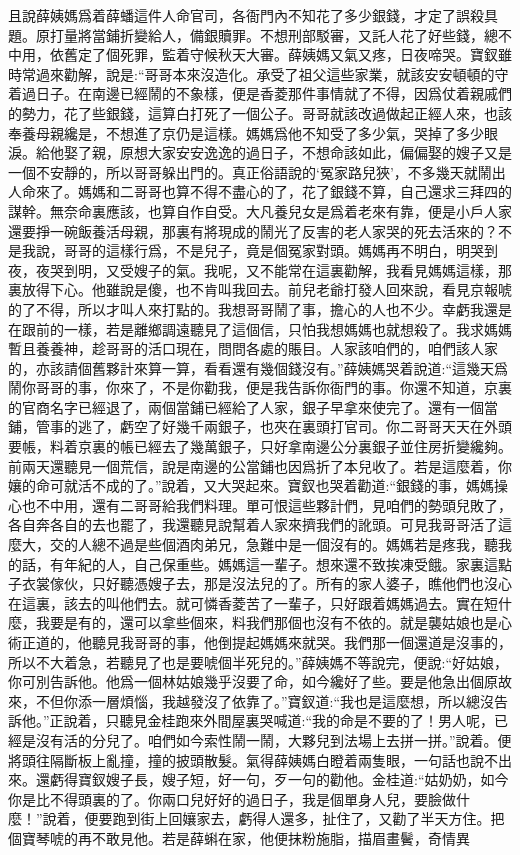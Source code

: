 \begin{parag}
    且說薛姨媽爲着薛蟠這件人命官司，各衙門內不知花了多少銀錢，才定了誤殺具題。原打量將當鋪折變給人，備銀贖罪。不想刑部駁審，又託人花了好些錢，總不中用，依舊定了個死罪，監着守候秋天大審。薛姨媽又氣又疼，日夜啼哭。寶釵雖時常過來勸解，說是:“哥哥本來沒造化。承受了祖父這些家業，就該安安頓頓的守着過日子。在南邊已經鬧的不象樣，便是香菱那件事情就了不得，因爲仗着親戚們的勢力，花了些銀錢，這算白打死了一個公子。哥哥就該改過做起正經人來，也該奉養母親纔是，不想進了京仍是這樣。媽媽爲他不知受了多少氣，哭掉了多少眼淚。給他娶了親，原想大家安安逸逸的過日子，不想命該如此，偏偏娶的嫂子又是一個不安靜的，所以哥哥躲出門的。真正俗語說的‘冤家路兒狹’，不多幾天就鬧出人命來了。媽媽和二哥哥也算不得不盡心的了，花了銀錢不算，自己還求三拜四的謀幹。無奈命裏應該，也算自作自受。大凡養兒女是爲着老來有靠，便是小戶人家還要掙一碗飯養活母親，那裏有將現成的鬧光了反害的老人家哭的死去活來的？不是我說，哥哥的這樣行爲，不是兒子，竟是個冤家對頭。媽媽再不明白，明哭到夜，夜哭到明，又受嫂子的氣。我呢，又不能常在這裏勸解，我看見媽媽這樣，那裏放得下心。他雖說是傻，也不肯叫我回去。前兒老爺打發人回來說，看見京報唬的了不得，所以才叫人來打點的。我想哥哥鬧了事，擔心的人也不少。幸虧我還是在跟前的一樣，若是離鄉調遠聽見了這個信，只怕我想媽媽也就想殺了。我求媽媽暫且養養神，趁哥哥的活口現在，問問各處的賬目。人家該咱們的，咱們該人家的，亦該請個舊夥計來算一算，看看還有幾個錢沒有。”薛姨媽哭着說道:“這幾天爲鬧你哥哥的事，你來了，不是你勸我，便是我告訴你衙門的事。你還不知道，京裏的官商名字已經退了，兩個當鋪已經給了人家，銀子早拿來使完了。還有一個當鋪，管事的逃了，虧空了好幾千兩銀子，也夾在裏頭打官司。你二哥哥天天在外頭要帳，料着京裏的帳已經去了幾萬銀子，只好拿南邊公分裏銀子並住房折變纔夠。前兩天還聽見一個荒信，說是南邊的公當鋪也因爲折了本兒收了。若是這麼着，你孃的命可就活不成的了。”說着，又大哭起來。寶釵也哭着勸道:“銀錢的事，媽媽操心也不中用，還有二哥哥給我們料理。單可恨這些夥計們，見咱們的勢頭兒敗了，各自奔各自的去也罷了，我還聽見說幫着人家來擠我們的訛頭。可見我哥哥活了這麼大，交的人總不過是些個酒肉弟兄，急難中是一個沒有的。媽媽若是疼我，聽我的話，有年紀的人，自己保重些。媽媽這一輩子。想來還不致挨凍受餓。家裏這點子衣裳傢伙，只好聽憑嫂子去，那是沒法兒的了。所有的家人婆子，瞧他們也沒心在這裏，該去的叫他們去。就可憐香菱苦了一輩子，只好跟着媽媽過去。實在短什麼，我要是有的，還可以拿些個來，料我們那個也沒有不依的。就是襲姑娘也是心術正道的，他聽見我哥哥的事，他倒提起媽媽來就哭。我們那一個還道是沒事的，所以不大着急，若聽見了也是要唬個半死兒的。”薛姨媽不等說完，便說:“好姑娘，你可別告訴他。他爲一個林姑娘幾乎沒要了命，如今纔好了些。要是他急出個原故來，不但你添一層煩惱，我越發沒了依靠了。”寶釵道:“我也是這麼想，所以總沒告訴他。”正說着，只聽見金桂跑來外間屋裏哭喊道:“我的命是不要的了！男人呢，已經是沒有活的分兒了。咱們如今索性鬧一鬧，大夥兒到法場上去拼一拼。”說着。便將頭往隔斷板上亂撞，撞的披頭散髮。氣得薛姨媽白瞪着兩隻眼，一句話也說不出來。還虧得寶釵嫂子長，嫂子短，好一句，歹一句的勸他。金桂道:“姑奶奶，如今你是比不得頭裏的了。你兩口兒好好的過日子，我是個單身人兒，要臉做什麼！”說着，便要跑到街上回孃家去，虧得人還多，扯住了，又勸了半天方住。把個寶琴唬的再不敢見他。若是薛蝌在家，他便抹粉施脂，描眉畫鬢，奇情異
\end{parag}
